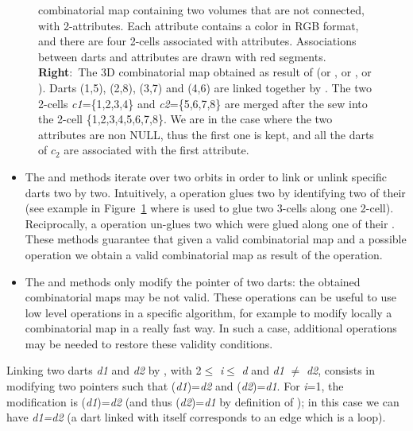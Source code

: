 \begin{figure}
{    combinatorial map containing two volumes that are not connected,
    with 2-attributes. Each attribute contains a color in RGB format,
    and there are four 2-cells associated with attributes.
    Associations between darts and attributes are drawn with red
    segments. \textbf{Right}:~The 3D combinatorial map obtained as
    result of  (or , or
    , or ). Darts (1,5), (2,8),
    (3,7) and (4,6) are linked together by \betatrois{}. The two 2-cells
    \emph{c1}=\{1,2,3,4\} and \emph{c2}=\{5,6,7,8\} are merged after the sew
    into the 2-cell \{1,2,3,4,5,6,7,8\}. We are in the case where
    the two attributes are non NULL, thus the first one is kept, and
    all the darts of $c_2$ are associated with the first attribute.}
  \label{fig-exemple-sew}
\end{figure}
\begin{itemize}
\item The  and  methods iterate over two orbits in
  order to link or unlink specific darts two by two.  Intuitively, a
   operation glues two  by identifying two of
  their  (see example in Figure~\ref{fig-exemple-sew}
  where  is used to glue two 3-cells along one 2-cell).
  Reciprocally, a  operation un-glues two  which
  were glued along one of their .
  These methods guarantee that given a valid combinatorial map and a
  possible operation we obtain a valid combinatorial map as result of
  the operation.

\item
\begin{ccAdvanced}
The  and  methods only modify
  the pointer of two darts: the obtained combinatorial maps may be not
  valid. These operations can be useful to use low level operations
  in a specific algorithm, for example to modify locally a
  combinatorial map in a really fast way. In such a case, additional
  operations may be needed to restore these validity conditions.
\end{ccAdvanced}
\end{itemize}

Linking two darts \emph{d1} and \emph{d2} by \betai{}, with 2$\leq$ \emph{i}$\leq$ \emph{d}
and \emph{d1} $\neq$ \emph{d2}, consists in modifying two \betai{} pointers such that
\betai{}(\emph{d1})=\emph{d2} and \betai{}(\emph{d2})=\emph{d1}. For \emph{i}=1, the modification
is \betaun{}(\emph{d1})=\emph{d2} (and thus \betazero{}(\emph{d2})=\emph{d1} by definition of
\betazero{}); in this case we can have \emph{d1=d2} (a dart linked with
itself corresponds to an edge which is a loop).


